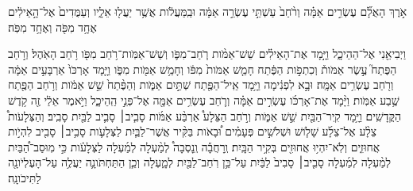 \documentclass{openreader}
\begin{document}
אֹ֣רֶךְ הָאֻלָ֞ם עֶשְׂרִ֣ים אַמָּ֗ה וְרֹ֨חַב֙ עַשְׁתֵּ֣י עֶשְׂרֵ֣ה אַמָּ֔ה וּבַֽמַּעֲלֹ֔ות אֲשֶׁ֥ר יַעֲל֖וּ אֵלָ֑יו וְעַמֻּדִים֙ אֶל־הָ֣אֵילִ֔ים אֶחָ֥ד מִפֹּ֖ה וְאֶחָ֥ד מִפֹּֽה׃ 

וַיְבִיאֵ֖נִי אֶל־הַהֵיכָ֑ל וַיָּ֣מָד אֶת־הָאֵילִ֗ים שֵׁשׁ־אַמֹּ֨ות רֹ֧חַב־מִפֹּ֛ו וְשֵׁשׁ־אַמֹּֽות־רֹ֥חַב מִפֹּ֖ו רֹ֥חַב הָאֹֽהֶל׃ 
וְרֹ֣חַב הַפֶּתַח֮ עֶ֣שֶׂר אַמֹּות֒ וְכִתְפֹ֣ות הַפֶּ֔תַח חָמֵ֤שׁ אַמֹּות֙ מִפֹּ֔ו וְחָמֵ֥שׁ אַמֹּ֖ות מִפֹּ֑ו וַיָּ֤מָד אָרְכֹּו֙ אַרְבָּעִ֣ים אַמָּ֔ה וְרֹ֖חַב עֶשְׂרִ֥ים אַמָּֽה׃ 
וּבָ֣א לִפְנִ֔ימָה וַיָּ֥מָד אֵֽיל־הַפֶּ֖תַח שְׁתַּ֣יִם אַמֹּ֑ות וְהַפֶּ֨תַח֙ שֵׁ֣שׁ אַמֹּ֔ות וְרֹ֥חַב הַפֶּ֖תַח שֶׁ֥בַע אַמֹּֽות׃ 
וַיָּ֨מָד אֶת־אָרְכֹּ֜ו עֶשְׂרִ֣ים אַמָּ֗ה וְרֹ֛חַב עֶשְׂרִ֥ים אַמָּ֖ה אֶל־פְּנֵ֣י הַֽהֵיכָ֑ל וַיֹּ֣אמֶר אֵלַ֔י זֶ֖ה קֹ֥דֶשׁ הַקֳּדָשִֽׁים׃ 
וַיָּ֥מָד קִֽיר־הַבַּ֖יִת שֵׁ֣שׁ אַמֹּ֑ות וְרֹ֣חַב הַצֵּלָע֩ אַרְבַּ֨ע אַמֹּ֜ות סָבִ֧יב׀ סָבִ֛יב לַבַּ֖יִת סָבִֽיב׃ 
וְהַצְּלָעֹות֩ צֵלָ֨ע אֶל־צֵלָ֜ע שָׁלֹ֧ושׁ וּשְׁלֹשִׁ֣ים פְּעָמִ֗ים וּ֠בָאֹות בַּקִּ֨יר אֲשֶׁר־לַבַּ֧יִת לַצְּלָעֹ֛ות סָבִ֥יב׀ סָבִ֖יב לִהְיֹ֣ות אֲחוּזִ֑ים וְלֹֽא־יִהְי֥וּ אֲחוּזִ֖ים בְּקִ֥יר הַבָּֽיִת׃ 
וְֽרָחֲבָ֡ה וְֽנָסְבָה֩ לְמַ֨עְלָה לְמַ֜עְלָה לַצְּלָעֹ֗ות כִּ֣י מֽוּסַב־הַ֠בַּיִת לְמַ֨עְלָה לְמַ֜עְלָה סָבִ֤יב׀ סָבִיב֙ לַבַּ֔יִת עַל־כֵּ֥ן רֹֽחַב־לַבַּ֖יִת לְמָ֑עְלָה וְכֵ֧ן הַתַּחְתֹּונָ֛ה יַעֲלֶ֥ה עַל־הָעֶלְיֹונָ֖ה לַתִּיכֹונָֽה׃ 
\end{document}
